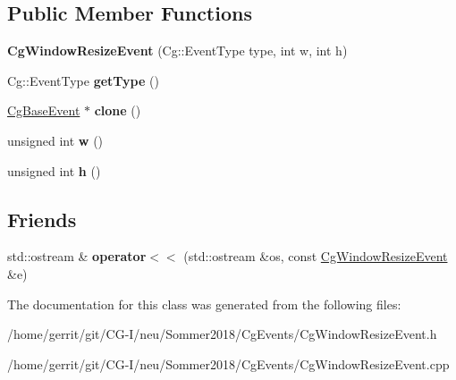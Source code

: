 \subsection*{Public Member Functions}
\begin{DoxyCompactItemize}
\item 
\mbox{\label{class_cg_window_resize_event_a3612bb995e851b2bb70e2bc86b3e6219}} 
{\bfseries Cg\+Window\+Resize\+Event} (Cg\+::\+Event\+Type type, int w, int h)
\item 
\mbox{\label{class_cg_window_resize_event_ac43982b91ae52c8d9ddc2c94793c851a}} 
Cg\+::\+Event\+Type {\bfseries get\+Type} ()
\item 
\mbox{\label{class_cg_window_resize_event_abbd5461bca81087fea976ac3be73179d}} 
\hyperlink{class_cg_base_event}{Cg\+Base\+Event} $\ast$ {\bfseries clone} ()
\item 
\mbox{\label{class_cg_window_resize_event_af9c5c79b237aa03c5f728009f853beea}} 
unsigned int {\bfseries w} ()
\item 
\mbox{\label{class_cg_window_resize_event_a9713998badae2264d78a0a854beeaed9}} 
unsigned int {\bfseries h} ()
\end{DoxyCompactItemize}
\subsection*{Friends}
\begin{DoxyCompactItemize}
\item 
\mbox{\label{class_cg_window_resize_event_a7dc3a5977091a63744dd5f29bd2fd573}} 
std\+::ostream \& {\bfseries operator$<$$<$} (std\+::ostream \&os, const \hyperlink{class_cg_window_resize_event}{Cg\+Window\+Resize\+Event} \&e)
\end{DoxyCompactItemize}


The documentation for this class was generated from the following files\+:\begin{DoxyCompactItemize}
\item 
/home/gerrit/git/\+C\+G-\/\+I/neu/\+Sommer2018/\+Cg\+Events/Cg\+Window\+Resize\+Event.\+h\item 
/home/gerrit/git/\+C\+G-\/\+I/neu/\+Sommer2018/\+Cg\+Events/Cg\+Window\+Resize\+Event.\+cpp\end{DoxyCompactItemize}
